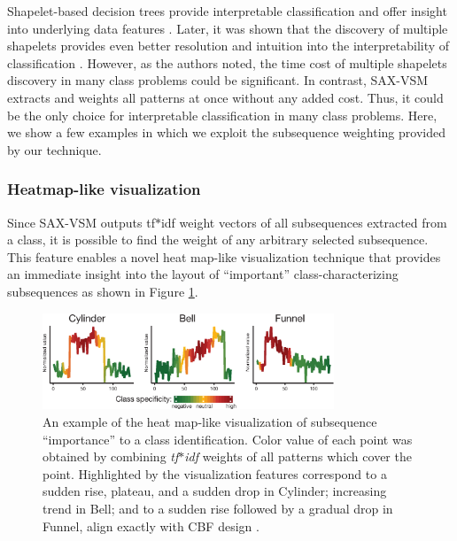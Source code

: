 \documentclass[conference]{IEEEtran}
\begin{document}
Shapelet-based decision trees provide interpretable classification and offer insight 
into underlying data features \cite{shapelet}. 
Later, it was shown that the discovery of multiple shapelets provides even 
better resolution and intuition into the interpretability of classification \cite{bagnal}. 
However, as the authors noted, the time cost of multiple shapelets discovery
in many class problems could be significant. 
In contrast, SAX-VSM extracts and weights all patterns at once without
any added cost. Thus, it could be the only choice for interpretable classification 
in many class problems. 
Here, we show a few examples in which we exploit the subsequence weighting 
provided by our technique.

\subsubsection{Heatmap-like visualization}
Since SAX-VSM outputs tf$\ast$idf weight vectors of all subsequences extracted from a
class, it is possible to find the weight of any arbitrary selected subsequence.
This feature enables a novel heat map-like visualization technique that provides an immediate
insight into the layout of ``important'' class-characterizing subsequences 
as shown in Figure \ref{fig:heat}.

\begin{figure}[t]
   \centering
   \vspace{0.09cm}
   \includegraphics[width=87mm]{figures/CBF-HEAT.eps}
   \caption{An example of the heat map-like visualization of subsequence ``importance''
   to a class identification. Color value of each point was obtained by combining 
   \textit{tf$\ast$idf} weights of all patterns which cover the point.
   Highlighted by the visualization features correspond to a sudden rise, plateau, 
   and a sudden drop in Cylinder; increasing trend in Bell; and to a sudden rise 
   followed by a gradual drop in Funnel, align exactly with CBF design \cite{cbf}.}
   \label{fig:heat}
   \vspace{-0.15cm}
\end{figure}
\end{document}
